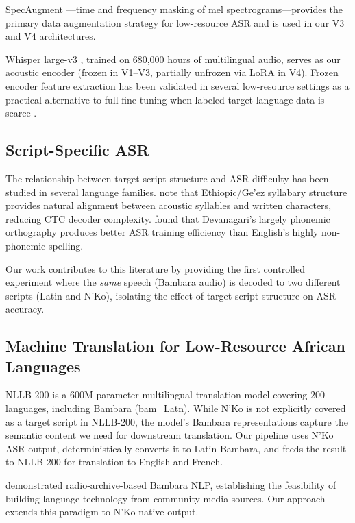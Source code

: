 \documentclass[11pt]{article}
\begin{document}
SpecAugment \cite{park2019specaugment}---time and frequency masking of mel spectrograms---provides the primary data augmentation strategy for low-resource ASR and is used in our V3 and V4 architectures.

Whisper large-v3 \cite{radford2023robust}, trained on 680,000 hours of multilingual audio, serves as our acoustic encoder (frozen in V1--V3, partially unfrozen via LoRA in V4).
Frozen encoder feature extraction has been validated in several low-resource settings as a practical alternative to full fine-tuning when labeled target-language data is scarce \cite{san2021leveraging}.

\subsection{Script-Specific ASR}

The relationship between target script structure and ASR difficulty has been studied in several language families.
\citet{tonja2023natural} note that Ethiopic/Ge'ez syllabary structure provides natural alignment between acoustic syllables and written characters, reducing CTC decoder complexity.
\citet{kakwani2020indicnlpsuite} found that Devanagari's largely phonemic orthography produces better ASR training efficiency than English's highly non-phonemic spelling.

Our work contributes to this literature by providing the first controlled experiment where the \emph{same} speech (Bambara audio) is decoded to two different scripts (Latin and N'Ko), isolating the effect of target script structure on ASR accuracy.

\subsection{Machine Translation for Low-Resource African Languages}

NLLB-200 \cite{costa2022no} is a 600M-parameter multilingual translation model covering 200 languages, including Bambara (bam\_Latn).
While N'Ko is not explicitly covered as a target script in NLLB-200, the model's Bambara representations capture the semantic content we need for downstream translation.
Our pipeline uses N'Ko ASR output, deterministically converts it to Latin Bambara, and feeds the result to NLLB-200 for translation to English and French.

\citet{doumbouya2021} demonstrated radio-archive-based Bambara NLP, establishing the feasibility of building language technology from community media sources.
Our approach extends this paradigm to N'Ko-native output.
\end{document}
